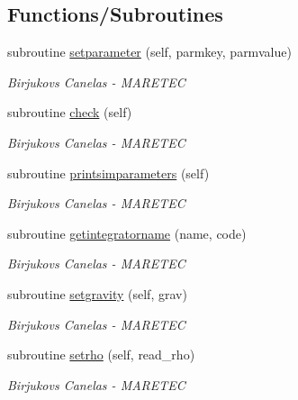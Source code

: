 \subsection*{Functions/\+Subroutines}
\begin{DoxyCompactItemize}
\item 
subroutine \mbox{\hyperlink{namespacesimulation__globals_aed3f671899558008ae9f0f009f581baf}{setparameter}} (self, parmkey, parmvalue)
\begin{DoxyCompactList}\small\item\em Birjukovs Canelas -\/ M\+A\+R\+E\+T\+EC \end{DoxyCompactList}\item 
subroutine \mbox{\hyperlink{namespacesimulation__globals_a3867df0f77dca3700c9470aea24fd048}{check}} (self)
\begin{DoxyCompactList}\small\item\em Birjukovs Canelas -\/ M\+A\+R\+E\+T\+EC \end{DoxyCompactList}\item 
subroutine \mbox{\hyperlink{namespacesimulation__globals_a0b17b2f2e9e7dbbad7c9d735217c1ee1}{printsimparameters}} (self)
\begin{DoxyCompactList}\small\item\em Birjukovs Canelas -\/ M\+A\+R\+E\+T\+EC \end{DoxyCompactList}\item 
subroutine \mbox{\hyperlink{namespacesimulation__globals_a2c6bf88542c503d1da58280ab3dcf772}{getintegratorname}} (name, code)
\begin{DoxyCompactList}\small\item\em Birjukovs Canelas -\/ M\+A\+R\+E\+T\+EC \end{DoxyCompactList}\item 
subroutine \mbox{\hyperlink{namespacesimulation__globals_ac655f60155581a71b312f3c1a8c87db2}{setgravity}} (self, grav)
\begin{DoxyCompactList}\small\item\em Birjukovs Canelas -\/ M\+A\+R\+E\+T\+EC \end{DoxyCompactList}\item 
subroutine \mbox{\hyperlink{namespacesimulation__globals_acfdc640757f0275bccb1d8de7bd7dc92}{setrho}} (self, read\+\_\+rho)
\begin{DoxyCompactList}\small\item\em Birjukovs Canelas -\/ M\+A\+R\+E\+T\+EC \end{DoxyCompactList}\item 

\end{DoxyCompactItemize}
